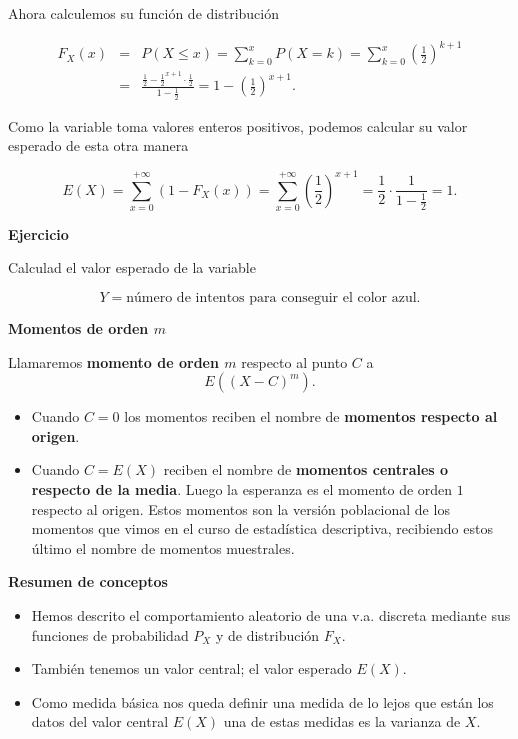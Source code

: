 \documentclass[]{book}
\providecommand{\tightlist}{%
  \setlength{\itemsep}{0pt}\setlength{\parskip}{0pt}}
\begin{document}
Ahora calculemos su función de distribución

\begin{eqnarray*}
F_X(x)&=& P(X\leq x)=\sum_{k=0}^x P(X=k)=\sum_{k=0}^x
\left(\frac12\right)^{k+1}\\
&=& \frac{\frac12-\frac12^{x+1}\cdot
\frac12}{1-\frac12}=1-\left(\frac12\right)^{x+1}.
\end{eqnarray*}

Como la variable toma valores enteros positivos, podemos calcular su valor esperado
de esta otra manera

\[E(X)=\sum_{x=0}^{+\infty} (1-F_X(x))=\sum_{x=0}^{+\infty}\left(\frac12\right)^{x+1}=\frac12\cdot
\frac1{1-\frac12}=1.\]

\textbf{Ejercicio}

Calculad el valor esperado de la variable

\[
Y=\mbox{número de intentos para conseguir el color azul.}
\]

 \textbf{Momentos de orden \(m\)}

Llamaremos \textbf{momento de orden \(m\)} respecto al punto \(C\) a
\[E\left((X-C)^m\right).\]

\begin{itemize}
\tightlist
\item
  Cuando \(C=0\) los momentos reciben el nombre de \textbf{momentos respecto al origen}.
\item
  Cuando \(C=E(X)\) reciben el nombre de \textbf{momentos centrales o respecto de la media}. Luego la esperanza es el momento de orden \(1\) respecto al origen. Estos momentos son la versión poblacional de los momentos que vimos en el curso de estadística descriptiva, recibiendo estos último el nombre de momentos muestrales.
\end{itemize}

\textbf{Resumen de conceptos}

\begin{itemize}
\tightlist
\item
  Hemos descrito el comportamiento aleatorio de una v.a. discreta mediante sus funciones de probabilidad \(P_{X}\) y de distribución \(F_{X}\).
\item
  También tenemos un valor central; el valor esperado \(E(X)\).
\item
  Como medida básica nos queda definir una medida de lo lejos que están los datos del valor central \(E(X)\) una de estas medidas es la varianza de \(X\).
\end{itemize}
\end{document}
